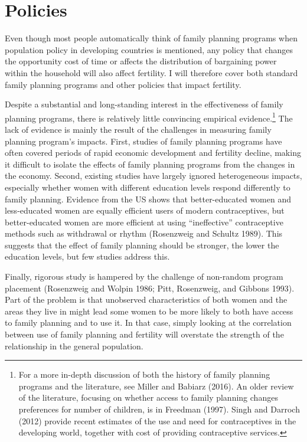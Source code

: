 \documentclass[]{article}
\begin{document}
\section{Policies}\label{policies}

Even though most people automatically think of family planning programs when population policy in developing countries is mentioned, any policy that changes the opportunity cost of time or affects the distribution of bargaining power within the household will also affect fertility. I will therefore cover both standard family planning programs and other policies that impact fertility.

Despite a substantial and long-standing interest in the effectiveness of family planning programs, there is relatively little convincing empirical evidence.\footnote{For a more in-depth discussion of both the history of family planning programs and the literature, see Miller and Babiarz (2016). An older review of the literature, focusing on whether access to family planning changes preferences for number of children, is in Freedman (1997). Singh and Darroch (2012) provide recent estimates of the use and need for contraceptives in the developing world, together with cost of providing contraceptive services.} The lack of evidence is mainly the result of the challenges in measuring family planning program's impacts. First, studies of family planning programs have often covered periods of rapid economic development and fertility decline, making it difficult to isolate the effects of family planning programs from the changes in the economy. Second, existing studies have largely ignored heterogeneous impacts, especially whether women with different education levels respond differently to family planning. Evidence from the US shows that better-educated women and less-educated women are equally efficient users of modern contraceptives, but better-educated women are more efficient at using ``ineffective'' contraceptive methods such as withdrawal or rhythm (Rosenzweig and Schultz 1989). This suggests that the effect of family planning should be stronger, the lower the education levels, but few studies address this.

Finally, rigorous study is hampered by the challenge of non-random program placement (Rosenzweig and Wolpin 1986; Pitt, Rosenzweig, and Gibbons 1993). Part of the problem is that unobserved characteristics of both women and the areas they live in might lead some women to be more likely to both have access to family planning and to use it. In that case, simply looking at the correlation between use of family planning and fertility will overstate the strength of the relationship in the general population.
\end{document}
